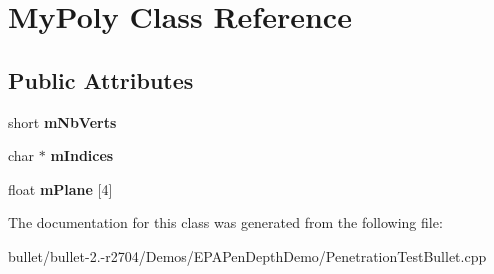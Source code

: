 \hypertarget{class_my_poly}{\section{My\+Poly Class Reference}
\label{class_my_poly}
}
\subsection*{Public Attributes}
\begin{DoxyCompactItemize}
\item 
\hypertarget{class_my_poly_aded37c835053845df86c09fe01da3093}{short {\bfseries m\+Nb\+Verts}}\label{class_my_poly_aded37c835053845df86c09fe01da3093}

\item 
\hypertarget{class_my_poly_ad485ef48449c9e0883fdf9bfb1ef4e85}{char $\ast$ {\bfseries m\+Indices}}\label{class_my_poly_ad485ef48449c9e0883fdf9bfb1ef4e85}

\item 
\hypertarget{class_my_poly_a750d57f4278a2710328411a007db86f1}{float {\bfseries m\+Plane} \mbox{[}4\mbox{]}}\label{class_my_poly_a750d57f4278a2710328411a007db86f1}

\end{DoxyCompactItemize}


The documentation for this class was generated from the following file\+:\begin{DoxyCompactItemize}
\item 
bullet/bullet-\/2.-\/r2704/\+Demos/\+E\+P\+A\+Pen\+Depth\+Demo/Penetration\+Test\+Bullet.\+cpp\end{DoxyCompactItemize}
